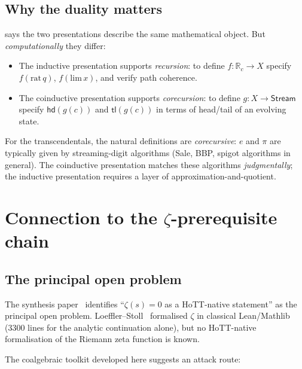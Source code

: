 \documentclass[12pt]{article}
\theoremstyle{definition}
\theoremstyle{remark}
\newcommand{\R}{\mathbb{R}}
\newcommand{\Rc}{\R_c}
\newcommand{\Stream}{\mathsf{Stream}}
\newcommand{\hd}{\mathsf{hd}}
\newcommand{\tl}{\mathsf{tl}}
\begin{document}
\subsection{Why the duality matters}

 says the two presentations describe the
same mathematical object. But \emph{computationally} they differ:

\begin{itemize}
\item The inductive presentation supports \emph{recursion}:
to define $f: \Rc \to X$ specify $f(\mathrm{rat}\,q)$,
$f(\mathrm{lim}\,x)$, and verify path coherence.
\item The coinductive presentation supports \emph{corecursion}:
to define $g: X \to \Stream$ specify $\hd(g(c))$ and $\tl(g(c))$
in terms of head/tail of an evolving state.
\end{itemize}

For the transcendentals, the natural definitions are
\emph{corecursive}: $e$ and $\pi$ are typically given by
streaming-digit algorithms (Sale, BBP, spigot algorithms in
general). The coinductive presentation matches these algorithms
\emph{judgmentally}; the inductive presentation requires a layer
of approximation-and-quotient.

\section{\texorpdfstring{Connection to the $\zeta$-prerequisite chain}{Connection to the zeta-prerequisite chain}}\label{sec:zeta}

\subsection{The principal open problem}

The synthesis paper~\cite[\S 7.3, \S 8 item 2]{synthesis} identifies
``$\zeta(s)=0$ as a HoTT-native statement'' as the principal open
problem. Loeffler--Stoll~\cite{loefflerstoll} formalised
$\zeta$ in classical Lean/Mathlib (3300 lines for the analytic
continuation alone), but no HoTT-native formalisation of the
Riemann zeta function is known.

The coalgebraic toolkit developed here suggests an attack route:
\end{document}
